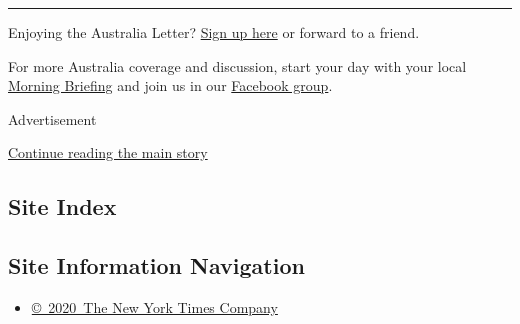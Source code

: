 \begin{center}\rule{0.5\linewidth}{\linethickness}\end{center}

Enjoying the Australia Letter?
\href{https://www.nytimes3xbfgragh.onion/newsletters/australia-letter?utm_source=ausend}{Sign
up here} or forward to a friend.

For more Australia coverage and discussion, start your day with your
local
\href{https://www.nytimes3xbfgragh.onion/interactive/2018/briefing/global-morning-briefing-newsletter-signup.html?utm_source=ausend}{Morning
Briefing} and join us in our
\href{https://www.facebookcorewwwi.onion/groups/nytaustralia/}{Facebook
group}.

Advertisement

\protect\hyperlink{after-bottom}{Continue reading the main story}

\hypertarget{site-index}{%
\subsection{Site Index}\label{site-index}}

\hypertarget{site-information-navigation}{%
\subsection{Site Information
Navigation}\label{site-information-navigation}}

\begin{itemize}
\tightlist
\item
  \href{https://help.nytimes3xbfgragh.onion/hc/en-us/articles/115014792127-Copyright-notice}{©~2020~The
  New York Times Company}
\end{itemize}

